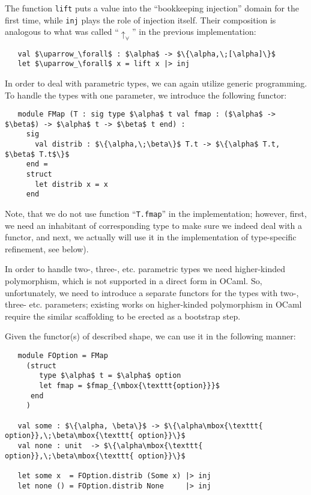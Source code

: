 The function \lstinline{lift} puts a value into the ``bookkeeping injection'' domain for the first time, while
\lstinline{inj} plays the role of injection itself. Their composition is analogous to what was 
called ``$\uparrow_\forall$'' in the previous implementation:

\begin{lstlisting}
   val $\uparrow_\forall$ : $\alpha$ -> $\{\alpha,\;[\alpha]\}$
   let $\uparrow_\forall$ x = lift x |> inj
\end{lstlisting}

In order to deal with parametric types, we can again utilize generic programming. To handle the types with
one parameter, we introduce the following functor:

\begin{lstlisting}
   module FMap (T : sig type $\alpha$ t val fmap : ($\alpha$ -> $\beta$) -> $\alpha$ t -> $\beta$ t end) :      
     sig 
       val distrib : $\{\alpha,\;\beta\}$ T.t -> $\{\alpha$ T.t, $\beta$ T.t$\}$ 
     end =
     struct
       let distrib x = x
     end
\end{lstlisting}

Note, that we do not use function ``\lstinline{T.fmap}'' in the implementation; however, first, we need an inhabitant of
corresponding type to make sure we indeed deal with a functor, and next, we actually will use it in the 
implementation of type-specific refinement, see below).

In order to handle two-, three-, etc. parametric types we need higher-kinded polymorphism, which is
not supported in a direct form in OCaml. So, unfortunately, we need to introduce a separate
functors for the types with two-, three- etc. parameters; existing works on higher-kinded
polymorphism in OCaml~\cite{HKinded} require the similar scaffolding to be erected as a bootstrap step.

Given the functor(s) of described shape, we can use it in the following manner:

\begin{lstlisting}
   module FOption = FMap 
     (struct 
        type $\alpha$ t = $\alpha$ option 
        let fmap = $fmap_{\mbox{\texttt{option}}}$ 
      end
     )

   val some : $\{\alpha, \beta\}$ -> $\{\alpha\mbox{\texttt{ option}},\;\beta\mbox{\texttt{ option}}\}$
   val none : unit  -> $\{\alpha\mbox{\texttt{ option}},\;\beta\mbox{\texttt{ option}}\}$
   
   let some x  = FOption.distrib (Some x) |> inj
   let none () = FOption.distrib None     |> inj
\end{lstlisting}

